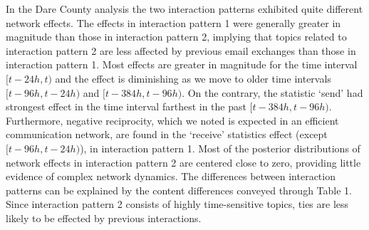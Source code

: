 In the Dare County analysis the two interaction patterns exhibited quite different network effects. The effects in interaction pattern 1 were generally greater in magnitude than those in interaction pattern 2, implying that topics related to interaction pattern 2 are less affected by previous email exchanges than those in interaction pattern 1. Most effects are greater in magnitude for the time interval $[t-24h, t)$ and the effect is diminishing as we move to older time intervals $[t-96h, t-24h)$ and $[t-384h, t-96h)$. On the contrary, the statistic `send' had strongest effect in the time interval farthest in the past $[t-384h, t-96h)$. Furthermore, negative reciprocity, which we noted is expected in an efficient communication network, are found in the `receive' statistics effect (except $[t-96h, t-24h)$), in interaction pattern 1.  Most of the posterior distributions of network effects in interaction pattern 2 are centered close to zero, providing little evidence of complex network dynamics. The differences between interaction patterns can be explained by the content differences conveyed through Table 1. Since interaction pattern 2 consists of highly time-sensitive topics, ties are less likely to be effected by previous interactions.
